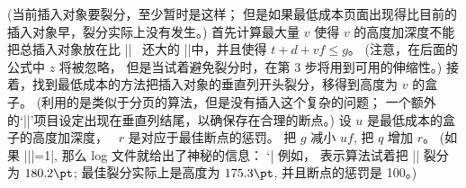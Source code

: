 \medbreak
{} (当前插入对象要裂分，至少暂时是这样；
但是如果最低成本页面出现得比目前的插入对象早，裂分实际上没有发生。)
首先计算最大量 $v$ 使得 $v$ 的高度加深度不能把总插入对象放在比 |\dimen|\n~%
还大的 |\box|\n 中，并且使得 $t+d+vf\le g$。
\1(注意，在后面的公式中 $z$ 将被忽略，
但是当试着避免裂分时，在第 3 步将用到可用的伸缩性。)
接着，找到最低成本的方法把插入对象的垂直列开头裂分，移得到高度为 $v$ 的盒子。%
(利用的是类似于分页的算法，但是没有插入这个复杂的问题；
一个额外的`||'项目设定出现在垂直列结尾，以确保存在合理的断点。)
设 $u$ 是最低成本的盒子的高度加深度，
~$r$ 是对应于最佳断点的惩罚。%
把 $g$ 减小 $uf$, 把 $q$ 增加 $r$。%
(如果 |\tracingpages||=1|, 那么 log 文件就给出了神秘的信息：
`|%
例如，
\begintt
\endtt
表示算法试着把 || 裂分为 $180.2\pt$;
最佳裂分实际上是高度为 $175.3\pt$,
并且断点的惩罚是 100。)

